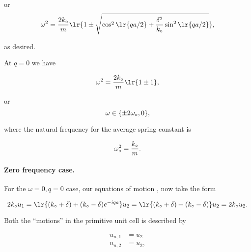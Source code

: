 {or
\begin{dmath}\label{eqn:condensedMatterProblemSet4Problem2:280}
\omega^2 =
\frac{2 k_\nought }{m} \lr{ 1
\pm
\sqrt{
\cos^2 \lr{ q a /2 }
+
\frac{\delta^2}{k_\nought} \sin^2 \lr{ q a /2 }
}
},
\end{dmath}

as desired.


At \(q = 0\) we have

\begin{dmath}\label{eqn:condensedMatterProblemSet4Problem2:400}
\omega^2 = \frac{2 k_\nought }{m} \lr{ 1 \pm 1 },
\end{dmath}

or
\begin{dmath}\label{eqn:condensedMatterProblemSet4Problem2:420}
\omega \in \{ \pm 2 \omega_\nought, 0 \},
\end{dmath}

where the natural frequency for the average spring constant is

\begin{dmath}\label{eqn:condensedMatterProblemSet4Problem2:580}
\omega_\nought^2 = \frac{k_\nought}{m}.
\end{dmath}

\paragraph{Zero frequency case.}

For the \(\omega = 0, q = 0\) case, our equations of motion
, now take the form

\begin{dmath}\label{eqn:condensedMatterProblemSet4Problem2:440}
2 k_\nought u_1
=
\lr{
 (k_\nought + \delta)
+ (k_\nought - \delta)
e^{ -i q a }
}
u_2
=
\lr{
 (k_\nought + \delta)
+ (k_\nought - \delta)
}
u_2
=
2 k_\nought u_2.
\end{dmath}

Both the ``motions'' in the primitive unit cell is described by

\begin{dmath}\label{eqn:condensedMatterProblemSet4Problem2:620}
\begin{aligned}
u_{n, 1} &= u_2 \\
u_{n, 2} &= u_2,
\end{aligned}
\end{dmath}

}
